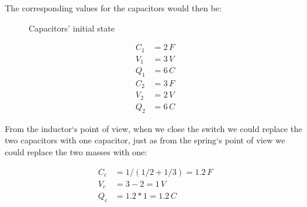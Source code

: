 \documentclass[]{../common/elementary-physics}
\begin{document}
The corresponding values for the capacitors would then be:

\begin{figure}[ht] \centering
	\qquad
	\caption{Capacitors' initial state}
\end{figure}

\begin{subequations}
\begin{align}
C_1 &= 2 \, F \\
V_1 &= 3 \, V \\
Q_1 &= 6 \, C \\
C_2 &= 3 \, F \\
V_2 &= 2 \, V \\
Q_2 &= 6 \, C
\end{align}
\end{subequations}

From the inductor`s point of view, when we close the switch we could replace the two capacitors with one capacitor, just as from the spring`s point of view we could replace the two masses with one:

\begin{subequations}
\begin{align}
C_c &= 1/(1/2 + 1/3) = 1.2 \, F \\
V_c &= 3 - 2 = 1 \, V \\
Q_c &= 1.2 * 1 = 1.2 \, C
\end{align}
\end{subequations}
\end{document}
